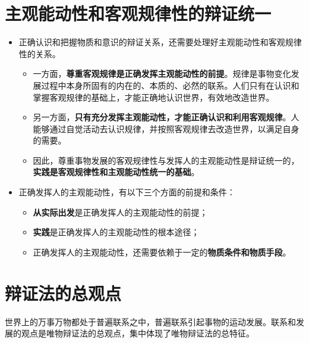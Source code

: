 \documentclass[12pt,openany]{ctexbook}
\begin{document}
\section{主观能动性和客观规律性的辩证统一}
\begin{itemize}
  \item 正确认识和把握物质和意识的辩证关系，还需要处理好主观能动性和客观规律性的关系。
\begin{itemize}
  \item 一方面，\textbf{尊重客观规律是正确发挥主观能动性的前提}。规律是事物变化发展过程中本身所固有的内在的、本质的、必然的联系。人们只有在认识和掌握客观规律的基础上，才能正确地认识世界，有效地改造世界。
  \item 另一方面，\textbf{只有充分发挥主观能动性，才能正确认识和利用客观规律}。人能够通过自觉活动去认识规律，并按照客观规律去改造世界，以满足自身的需要。
  \item 因此，尊重事物发展的客观规律性与发挥人的主观能动性是辩证统一的，\textbf{实践是客观规律性和主观能动性统一的基础}。
\end{itemize}
  \item 正确发挥人的主观能动性，有以下三个方面的前提和条件：
\begin{itemize}
  \item \textbf{从实际出发}是正确发挥人的主观能动性的前提；
  \item \textbf{实践}是正确发挥人的主观能动性的根本途径；
  \item 正确发挥人的主观能动性，还需要依赖于一定的\textbf{物质条件和物质手段}。
\end{itemize}
\end{itemize}
\section{辩证法的总观点}
世界上的万事万物都处于普遍联系之中，普遍联系引起事物的运动发展。联系和发展的观点是唯物辩证法的总观点，集中体现了唯物辩证法的总特征。
\end{document}
